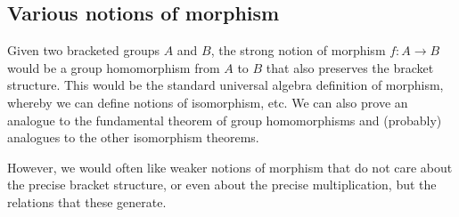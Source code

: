 \documentclass[10pt]{amsart}
\begin{document}
\subsection{Various notions of morphism}

Given two bracketed groups $A$ and $B$, the strong notion of morphism
$f:A \to B$ would be a group homomorphism from $A$ to $B$ that also
preserves the bracket structure. This would be the standard universal
algebra definition of morphism, whereby we can define notions of
isomorphism, etc. We can also prove an analogue to the fundamental
theorem of group homomorphisms and (probably) analogues to the other
isomorphism theorems.

However, we would often like weaker notions of morphism that do not
care about the precise bracket structure, or even about the precise
multiplication, but the relations that these generate.

\printindex
\end{document}
